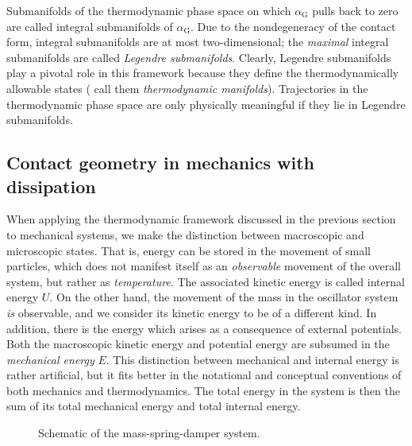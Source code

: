 Submanifolds of the thermodynamic phase space on which $\alpha_\text{G}$ pulls back to zero are called integral submanifolds of $\alpha_\text{G}$. Due to the nondegeneracy of the contact form, integral submanifolds are at most two-dimensional; the \emph{maximal} integral submanifolds are called \emph{Legendre submanifolds}. Clearly, Legendre submanifolds play a pivotal role in this framework because they define the thermodynamically allowable states (\citet{Balian2001} call them \emph{thermodynamic manifolds}). Trajectories in the thermodynamic phase space are only physically meaningful if they lie in Legendre submanifolds.

\subsection{Contact geometry in mechanics with dissipation}
\label{ssec:thermo_dho}
When applying the thermodynamic framework discussed in the previous section to mechanical systems, we make the distinction between macroscopic and microscopic states. That is, energy can be stored in the movement of small particles, which does not manifest itself as an \emph{observable} movement of the overall system, but rather as \emph{temperature}. The associated kinetic energy is called internal energy $U$. On the other hand, the movement of the mass in the oscillator system \emph{is} observable, and we consider its kinetic energy to be of a different kind. In addition, there is the energy which arises as a consequence of external potentials. Both the macroscopic kinetic energy and potential energy are subsumed in the \emph{mechanical energy} $E$. This distinction between mechanical and internal energy is rather artificial, but it fits better in the notational and conceptual conventions of both mechanics and thermodynamics. The total energy in the system is then the sum of its total mechanical energy and total internal energy.
\begin{figure}[ht!]
    \centering
    
    \caption{Schematic of the mass-spring-damper system.}
    \label{fig:dho}
\end{figure}

